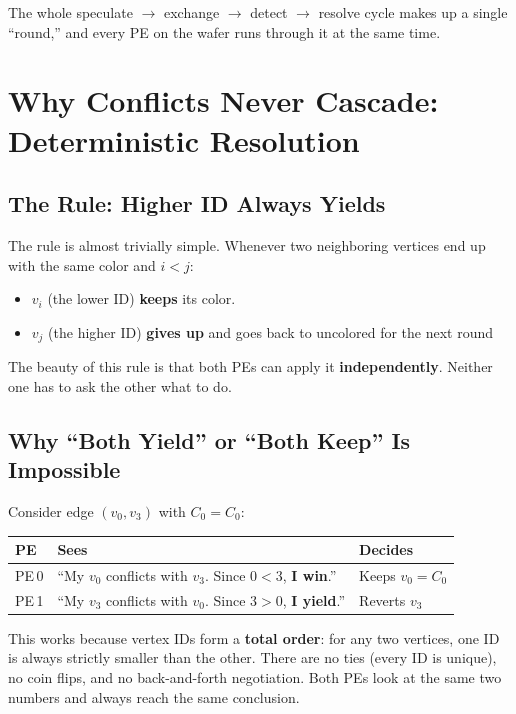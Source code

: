 \documentclass[11pt,letterpaper]{article}
\begin{document}
The whole speculate $\to$ exchange $\to$ detect $\to$ resolve cycle makes up a single ``round,'' and every PE on the wafer runs through it at the same time.

\section{Why Conflicts Never Cascade: Deterministic Resolution}
\label{sec:resolution}

\subsection{The Rule: Higher ID Always Yields}

The rule is almost trivially simple. Whenever two neighboring vertices end up with the same color and $i < j$:
\begin{itemize}[nosep]
  \item $v_i$ (the lower ID) \textbf{keeps} its color.
  \item $v_j$ (the higher ID) \textbf{gives up} and goes back to uncolored for the next round
\end{itemize}

The beauty of this rule is that both PEs can apply it \textbf{independently}. Neither one has to ask the other what to do.

\subsection{Why ``Both Yield'' or ``Both Keep'' Is Impossible}

Consider edge $(v_0, v_3)$ with $C_0 = C_0$:

\begin{center}
\renewcommand{\arraystretch}{1.3}
\begin{tabular}{lll}
\toprule
\textbf{PE} & \textbf{Sees} & \textbf{Decides} \\
\midrule
PE\,0 & ``My $v_0$ conflicts with $v_3$. Since $0 < 3$, \textbf{I win}.'' & Keeps $v_0 = C_0$ \\
PE\,1 & ``My $v_3$ conflicts with $v_0$. Since $3 > 0$, \textbf{I yield}.'' & Reverts $v_3$ \\
\bottomrule
\end{tabular}
\end{center}

This works because vertex IDs form a \textbf{total order}: for any two vertices, one ID is always strictly smaller than the other. There are no ties (every ID is unique), no coin flips, and no back-and-forth negotiation. Both PEs look at the same two numbers and always reach the same conclusion.
\end{document}
